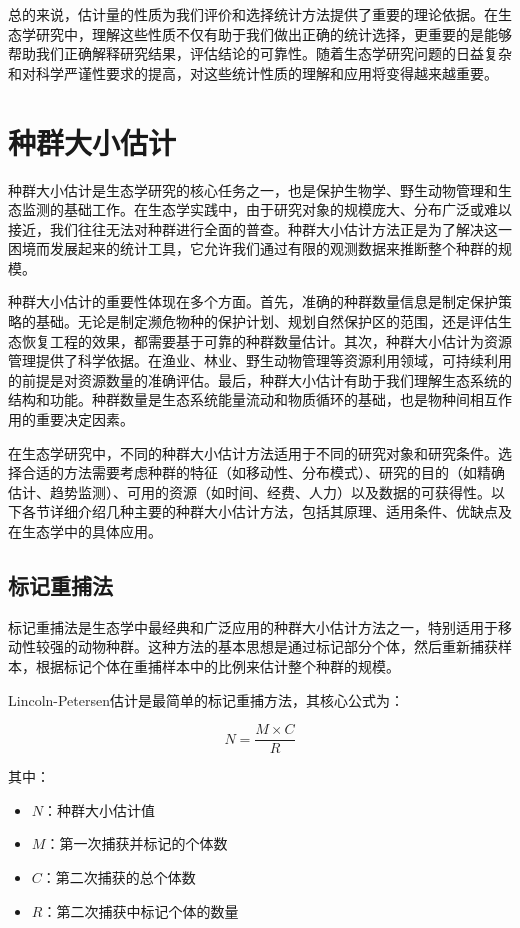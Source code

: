 \documentclass[
  twoside,12pt,fontset=none]{ctexbook}
\providecommand{\tightlist}{%
  \setlength{\itemsep}{0pt}\setlength{\parskip}{0pt}}
\begin{document}
总的来说，估计量的性质为我们评价和选择统计方法提供了重要的理论依据。在生态学研究中，理解这些性质不仅有助于我们做出正确的统计选择，更重要的是能够帮助我们正确解释研究结果，评估结论的可靠性。随着生态学研究问题的日益复杂和对科学严谨性要求的提高，对这些统计性质的理解和应用将变得越来越重要。

\hypertarget{ux79cdux7fa4ux5927ux5c0fux4f30ux8ba1}{%
\section{种群大小估计}\label{ux79cdux7fa4ux5927ux5c0fux4f30ux8ba1}}

种群大小估计是生态学研究的核心任务之一，也是保护生物学、野生动物管理和生态监测的基础工作。在生态学实践中，由于研究对象的规模庞大、分布广泛或难以接近，我们往往无法对种群进行全面的普查。种群大小估计方法正是为了解决这一困境而发展起来的统计工具，它允许我们通过有限的观测数据来推断整个种群的规模。

种群大小估计的重要性体现在多个方面。首先，准确的种群数量信息是制定保护策略的基础。无论是制定濒危物种的保护计划、规划自然保护区的范围，还是评估生态恢复工程的效果，都需要基于可靠的种群数量估计。其次，种群大小估计为资源管理提供了科学依据。在渔业、林业、野生动物管理等资源利用领域，可持续利用的前提是对资源数量的准确评估。最后，种群大小估计有助于我们理解生态系统的结构和功能。种群数量是生态系统能量流动和物质循环的基础，也是物种间相互作用的重要决定因素。

在生态学研究中，不同的种群大小估计方法适用于不同的研究对象和研究条件。选择合适的方法需要考虑种群的特征（如移动性、分布模式）、研究的目的（如精确估计、趋势监测）、可用的资源（如时间、经费、人力）以及数据的可获得性。以下各节详细介绍几种主要的种群大小估计方法，包括其原理、适用条件、优缺点及在生态学中的具体应用。

\hypertarget{ux6807ux8bb0ux91cdux6355ux6cd5}{%
\subsection{标记重捕法}\label{ux6807ux8bb0ux91cdux6355ux6cd5}}

标记重捕法是生态学中最经典和广泛应用的种群大小估计方法之一，特别适用于移动性较强的动物种群。这种方法的基本思想是通过标记部分个体，然后重新捕获样本，根据标记个体在重捕样本中的比例来估计整个种群的规模。

Lincoln-Petersen估计是最简单的标记重捕方法，其核心公式为：

\[N = \frac{M \times C}{R}\]

其中：

\begin{itemize}
\tightlist
\item
  \(N\)：种群大小估计值\\
\item
  \(M\)：第一次捕获并标记的个体数\\
\item
  \(C\)：第二次捕获的总个体数\\
\item
  \(R\)：第二次捕获中标记个体的数量
\end{itemize}
\end{document}

